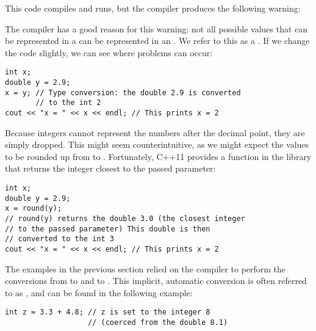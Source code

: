 This code compiles and runs, but the compiler produces the following warning:

\noindent {}

The compiler has a good reason for this warning: not all possible values that can be represented in a  can be represented in an . 
We refer to this as a . 
If we change the code slightly, we can see where problems can occur:

\noindent\begin{minipage}{\linewidth}\begin{lstlisting}
int x;
double y = 2.9;
x = y; // Type conversion: the double 2.9 is converted 
       // to the int 2
cout << "x = " << x << endl; // This prints x = 2
\end{lstlisting}\end{minipage}

Because integers cannot represent the numbers after the decimal point, they are simply dropped. 
This might seem counterintuitive, as we might expect the values to be rounded up from  to . 
Fortunately, C++11 provides a  function in the  library that returns the integer closest to the passed parameter:

\noindent\begin{minipage}{\linewidth}\begin{lstlisting}
int x;
double y = 2.9;
x = round(y); 
// round(y) returns the double 3.0 (the closest integer 
// to the passed parameter) This double is then 
// converted to the int 3
cout << "x = " << x << endl; // This prints x = 2
\end{lstlisting}\end{minipage}


The examples in the previous section relied on the compiler to perform the conversions from  to  and  to . 
This implicit, automatic conversion is often referred to as , and can be found in the following example:

\noindent\begin{minipage}{\linewidth}\begin{lstlisting}
int z = 3.3 + 4.8; // z is set to the integer 8 
                   // (coerced from the double 8.1)
\end{lstlisting}\end{minipage}


